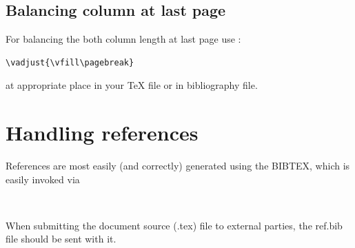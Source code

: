 \documentclass{juliacon}
\begin{document}
\subsection{Balancing column at last page}
\label{subsub:Balance}
For balancing the both column length at last page use :
\begin{verbatim}
\vadjust{\vfill\pagebreak}
\end{verbatim}


at appropriate place in your \TeX{} file or in bibliography file.

\section{Handling references}
\label{subsub:references}
References are most easily (and correctly) generated using the
BIBTEX, which is easily invoked via
\begin{verbatim}


\end{verbatim}
When submitting the document source (.tex) file to external
parties, the ref.bib file should be sent with it.
\cite{bezanson2017julia}


\end{document}

